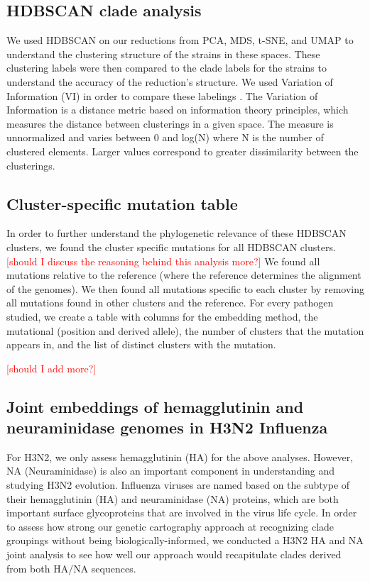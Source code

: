 \documentclass[10pt,letterpaper]{article}
\def\jhc#1{\textcolor{red}{[#1]}}
\begin{document}
\subsection*{HDBSCAN clade analysis}
We used HDBSCAN \cite{campello2015hierarchical} on our reductions from PCA, MDS, t-SNE, and UMAP to understand the clustering structure of the strains in these spaces.
These clustering labels were then compared to the clade labels for the strains to understand the accuracy of the reduction's structure.
We used Variation of Information (VI) in order to compare these labelings \cite{meilua2003comparing}.
The Variation of Information is a distance metric based on information theory principles, which measures the distance between clusterings in a given space.
The measure is unnormalized and varies between 0 and log(N) where N is the number of clustered elements.
Larger values correspond to greater dissimilarity between the clusterings.

\subsection*{Cluster-specific mutation table}
In order to further understand the phylogenetic relevance of these HDBSCAN clusters, we found the cluster specific mutations for all HDBSCAN clusters.
\jhc{should I discuss the reasoning behind this analysis more?}
We found all mutations relative to the reference (where the reference determines the alignment of the genomes).
We then found all mutations specific to each cluster by removing all mutations found in other clusters and the reference.
For every pathogen studied, we create a table with columns for the embedding method, the mutational (position and derived allele), the number of clusters that the mutation appears in, and the list of distinct clusters with the mutation.

\jhc{should I add more?}

\subsection*{Joint embeddings of hemagglutinin and neuraminidase genomes in H3N2 Influenza}

For H3N2, we only assess hemagglutinin (HA) for the above analyses.
However, NA (Neuraminidase) is also an important component in understanding and studying H3N2 evolution.
Influenza viruses are named based on the subtype of their hemagglutinin (HA) and neuraminidase (NA) proteins, which are both important surface glycoproteins that are involved in the virus life cycle.
In order to assess how strong our genetic cartography approach at recognizing clade groupings without being biologically-informed, we conducted a H3N2 HA and NA joint analysis to see how well our approach would recapitulate clades derived from both HA/NA sequences.
\end{document}
